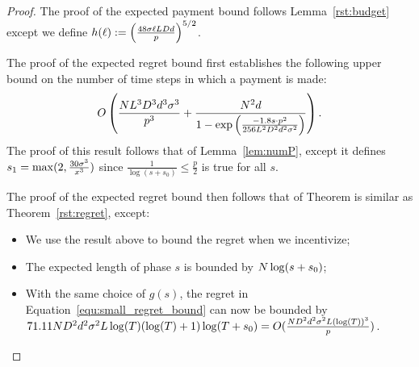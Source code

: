 \begin{proof}
The proof of the expected payment bound follows Lemma~\ref{rst:budget} except we define $h(\ell) := 
\left( \frac{48 \sigma \ell L D d}{p} \right)^{5/2}$.

The proof of the expected regret bound first establishes the following upper bound on the number of time steps in which a payment is made:
\begin{align}
O\left(\frac{N L^3 D^3 d^3 \sigma^3}{p^3}
  + \frac{N^2 d}{1 - \exp \left(
    \frac{-1.8 s \cdot p^2}{256 L^2 D^2 d^2 \sigma^2}
  \right)} \right). \nonumber 
\end{align}
The proof of this result follows that of Lemma~\ref{lem:numP}, except it defines $s_1 = \max(2, \frac{30 \sigma^3}{x^3})$ since $\frac{1}{\log(s+s_0)}\leq \frac{p}{2}$ is true for all $s$.

The proof of the expected regret bound then follows that of Theorem is similar as Theorem~\ref{rst:regret}, except:
\begin{itemize}
\item We use the result above to bound the regret when we incentivize;
\item The expected length of phase $s$ is bounded by $N \log(s+s_0)$;
\item With the same choice of $g(s)$, the regret in Equation~\ref{equ:small_regret_bound} can now be bounded by $71.11 ND^2 d^2\sigma^2 L\log(T)(\log(T)+1)\log(T+s_0)=O(\frac{ND^2 d^2\sigma^2 L(\log(T))^3}{p})$.
\end{itemize}
\end{proof}
